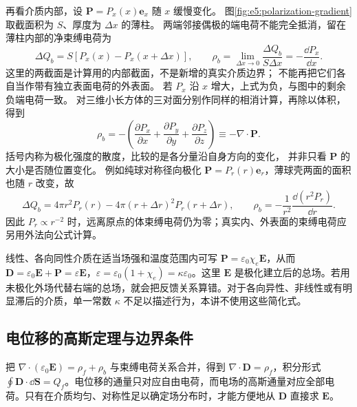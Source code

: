 再看介质内部，设 $\bm P=P_x(x)\bm e_x$ 随 $x$ 缓慢变化。
图\ref{fig:e5:polarization-gradient}取截面积为 $S$、厚度为 $\Delta x$ 的薄柱。
两端邻接偶极的端电荷不能完全抵消，留在薄柱内部的净束缚电荷为
\[
 \Delta Q_b=S[P_x(x)-P_x(x+\Delta x)],\qquad
 \rho_b=\lim_{\Delta x\to0}\frac{\Delta Q_b}{S\Delta x}
       =-\frac{\dd P_x}{\dd x}.
\]
这里的两截面是计算用的内部截面，不是新增的真实介质边界；
不能再把它们各自当作带有独立表面电荷的外表面。
若 $P_x$ 沿 $x$ 增大，上式为负，与图中的剩余负端电荷一致。
对三维小长方体的三对面分别作同样的相消计算，再除以体积，得到
\[
 \rho_b=-\left(\frac{\partial P_x}{\partial x}
 +\frac{\partial P_y}{\partial y}+\frac{\partial P_z}{\partial z}\right)
 \equiv-\nabla\cdot\bm P.
\]
括号内称为极化强度的散度，比较的是各分量沿自身方向的变化，
并非只看 $\bm P$ 的大小是否随位置变化。
例如纯球对称径向极化 $\bm P=P_r(r)\bm e_r$，薄球壳两面的面积也随 $r$ 改变，故
\[
 \Delta Q_b=4\pi r^2P_r(r)
 -4\pi(r+\Delta r)^2P_r(r+\Delta r),\qquad
 \rho_b=-\frac1{r^2}\frac{\dd(r^2P_r)}{\dd r}.
\]
因此 $P_r\propto r^{-2}$ 时，远离原点的体束缚电荷仍为零；真实内、外表面的束缚电荷应另用外法向公式计算。

线性、各向同性介质在适当场强和温度范围内可写 $\bm P=\varepsilon_0\chi_e\bm E$，从而 $\bm D=\varepsilon_0\bm E+\bm P=\varepsilon\bm E$，$\varepsilon=\varepsilon_0(1+\chi_e)=\kappa\varepsilon_0$。这里 $\bm E$ 是极化建立后的总场。若用未极化外场代替右端的总场，就会把反馈关系算错。对于各向异性、非线性或有明显滞后的介质，单一常数 $\kappa$ 不足以描述行为，本讲不使用这些简化式。

\subsection{电位移的高斯定理与边界条件}

把 $\nabla\cdot(\varepsilon_0\bm E)=\rho_f+\rho_b$ 与束缚电荷关系合并，得到 $\nabla\cdot\bm D=\rho_f$，积分形式 $\oint\bm D\cdot\dd\bm S=Q_f$。电位移的通量只对应自由电荷，而电场的高斯通量对应全部电荷。只有在介质均匀、对称性足以确定场分布时，才能方便地从 $\bm D$ 直接求 $\bm E$。

